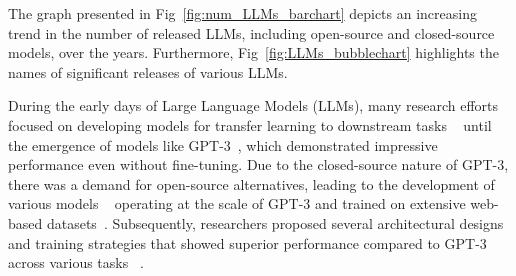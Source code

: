 
The graph presented in Fig~\ref{fig:num_LLMs_barchart} depicts an increasing trend in the number of released LLMs, including open-source and closed-source models, over the years. Furthermore, Fig~\ref{fig:LLMs_bubblechart} highlights the names of significant releases of various LLMs.







During the early days of Large Language Models (LLMs), many research efforts focused on developing models for transfer learning to downstream tasks ~\cite{T5, mT5, UL2} until the emergence of models like GPT-3~\cite{GPT-3}, which demonstrated impressive performance even without fine-tuning. Due to the closed-source nature of GPT-3, there was a demand for open-source alternatives, leading to the development of various models ~\cite{BLOOM, OPT} operating at the scale of GPT-3 and trained on extensive web-based datasets~\cite{Common_Crawl,Wikipedia,Openwebtext_Dataset,BQ_Dataset}.   Subsequently, researchers proposed several architectural designs and training strategies that showed superior performance compared to GPT-3 across various tasks ~\cite{UL2, PaLM, U-PaLM, mtnlg}. 

